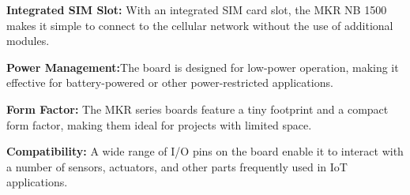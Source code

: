 \par 
\textbf{Integrated SIM Slot:} With an integrated SIM card slot, the MKR NB 1500 makes it simple to connect to the cellular network without the use of additional modules.

\par 
\textbf{Power Management:}The board is designed for low-power operation, making it effective for battery-powered or other power-restricted applications.

\par 
\textbf{Form Factor:} The MKR series boards feature a tiny footprint and a compact form factor, making them ideal for projects with limited space.

\par 
\textbf{Compatibility:} A wide range of I/O pins on the board enable it to interact with a number of sensors, actuators, and other parts frequently used in IoT applications.



